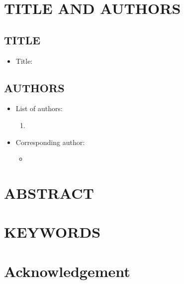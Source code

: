 \documentclass[12pt,english]{article}
\begin{document}

\setcounter{page}{1}

\section*{TITLE AND AUTHORS}
\subsection*{TITLE}
\begin{itemize}[label={}, leftmargin=*]
    \item Title: \textbf{\PAPERTITLE}
\end{itemize}
\subsection*{AUTHORS}
\begin{itemize}[label={}, leftmargin=*]
    \item List of authors:
    \begin{enumerate}
        \item \AUTHORHADAHINFO
    \end{enumerate}
    \item Corresponding author:
    \begin{itemize}
        \item \textbf{\AUTHORHADAHINFO}
    \end{itemize}
\end{itemize}
\clearpage 

\doublespacing
\section*{ABSTRACT}
\PAPERABSTRACT
\clearpage 

\doublespacing
\section*{KEYWORDS}
\PAPERKEYWORDS
\clearpage 


\doublespacing
\section*{Acknowledgement}
\ACKNOWLEDGMENTS
\clearpage 
\end{document}
